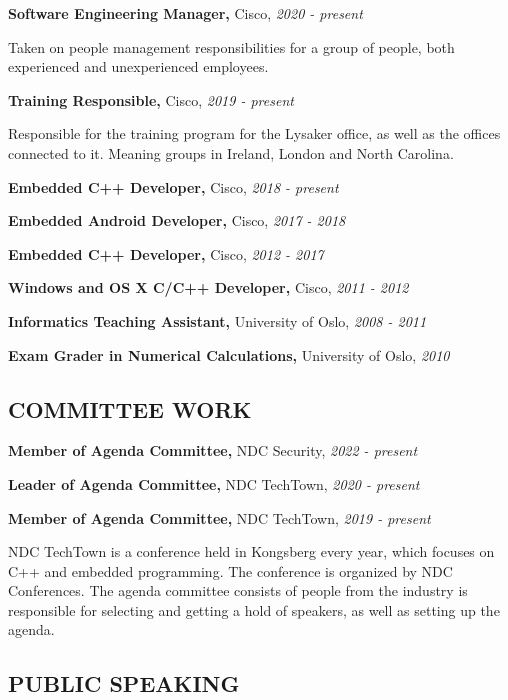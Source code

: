 \documentclass{article}
\newcommand\CVEntry[3]{
  {\bf #1,} #2, {\it #3}
}
\newcommand\CVComment[4]{
  \CVEntry{#1}{#2}{#3}

  #4
}
\begin{document}
\begin{addmargin}[2em]{0em}
  \CVComment{Software Engineering Manager}{Cisco}{2020 - present}{
    Taken on people management responsibilities for a group of people, both experienced and 
    unexperienced employees.}

  \CVComment{Training Responsible}{Cisco}{2019 - present}{
    Responsible for the training program for the Lysaker office, as well as the offices connected to
    it. Meaning groups in Ireland, London and North Carolina.}

  \CVEntry{Embedded C++ Developer}{Cisco}{2018 - present}

  \CVEntry{Embedded Android Developer}{Cisco}{2017 - 2018}

  \CVEntry{Embedded C++ Developer}{Cisco}{2012 - 2017}

  \CVEntry{Windows and OS X C/C++ Developer}{Cisco}{2011 - 2012}

  \CVEntry{Informatics Teaching Assistant}{University of Oslo}{2008 - 2011}

  \CVEntry{Exam Grader in Numerical Calculations}{University of Oslo}{2010}

\end{addmargin}

\subsection*{COMMITTEE WORK}

\begin{addmargin}[2em]{0em}
  \CVEntry{Member of Agenda Committee}{NDC Security}{2022 - present}

  \CVEntry{Leader of Agenda Committee}{NDC TechTown}{2020 - present}

  \CVComment{Member of Agenda Committee}{NDC TechTown}{2019 - present}{
    NDC TechTown is a conference held in Kongsberg every year, which focuses on C++
    and embedded programming. The conference is organized by NDC Conferences. The
    agenda committee consists of people from the industry is responsible for
    selecting and getting a hold of speakers, as well as setting up the agenda.}

\end{addmargin}

\subsection*{PUBLIC SPEAKING}
\end{document}
